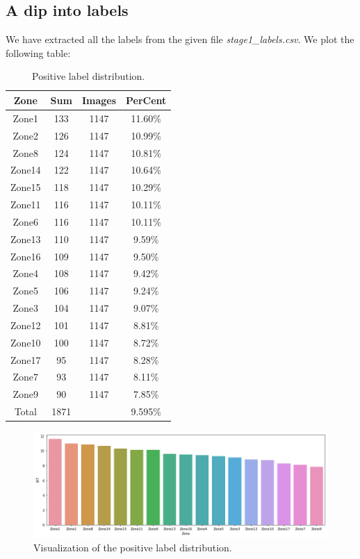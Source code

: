\documentclass[conference,compsoc]{IEEEtran}
\begin{document}
	\subsection{A dip into labels}
		\par We have extracted all the labels from the given file \textit{stage1\_labels.csv}. We plot the following table:
		\begin{table}[h]
			\centering
			\label{labels}
			\begin{tabular}{|c|c|c|c|}
			\hline
			Zone   & Sum & Images & PerCent \\ \hline
			Zone1  & 133 & 1147  & 11.60\% \\ \hline
			Zone2  & 126 & 1147  & 10.99\% \\ \hline
			Zone8  & 124 & 1147  & 10.81\% \\ \hline
			Zone14 & 122 & 1147  & 10.64\% \\ \hline
			Zone15 & 118 & 1147  & 10.29\% \\ \hline
			Zone11 & 116 & 1147  & 10.11\% \\ \hline
			Zone6  & 116 & 1147  & 10.11\% \\ \hline
			Zone13 & 110 & 1147  & 9.59\%  \\ \hline
			Zone16 & 109 & 1147  & 9.50\%  \\ \hline
			Zone4  & 108 & 1147  & 9.42\%  \\ \hline
			Zone5  & 106 & 1147  & 9.24\%  \\ \hline
			Zone3  & 104 & 1147  & 9.07\%  \\ \hline
			Zone12 & 101 & 1147  & 8.81\%  \\ \hline
			Zone10 & 100 & 1147  & 8.72\%  \\ \hline
			Zone17 & 95  & 1147  & 8.28\%  \\ \hline
			Zone7  & 93  & 1147  & 8.11\%  \\ \hline
			Zone9  & 90  & 1147  & 7.85\%  \\ \hline
			Total  & 1871  &   & 9.595\%  \\ \hline
			\end{tabular}
			\caption{Positive label distribution.}
		\end{table}
		\begin{figure} [h]
			\centering
			\includegraphics[width=\linewidth]{./Pic/bars}
			\caption{Visualization of the positive label distribution.}
			\label{bars}
		\end{figure}
\end{document}

